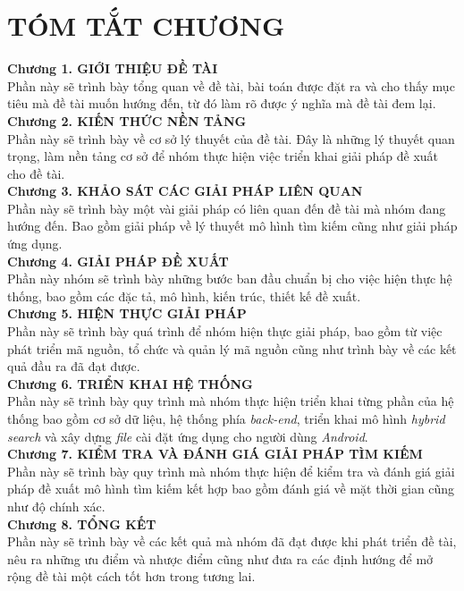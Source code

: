 \chapter*{TÓM TẮT CHƯƠNG}
\textbf{\color{myblue}Chương 1. GIỚI THIỆU ĐỀ TÀI}\\
Phần này sẽ trình bày tổng quan về đề tài, bài toán được đặt ra và cho thấy mục tiêu mà đề tài muốn hướng đến, từ đó làm rõ được ý nghĩa mà đề tài đem lại.
\\\textbf{\color{myblue}Chương 2. KIẾN THỨC NỀN TẢNG}\\
Phần này sẽ trình bày về cơ sở lý thuyết của đề tài. Đây là những lý thuyết quan trọng, làm nền tảng cơ sở để nhóm thực hiện việc triển khai giải pháp đề xuất cho đề tài.
\\\textbf{\color{myblue}Chương 3. KHẢO SÁT CÁC GIẢI PHÁP LIÊN QUAN}\\
Phần này sẽ trình bày một vài giải pháp có liên quan đến đề tài mà nhóm đang hướng đến. Bao gồm giải pháp về lý thuyết mô hình tìm kiếm cũng như giải pháp ứng dụng.
\\\textbf{\color{myblue}Chương 4. GIẢI PHÁP ĐỀ XUẤT}\\
Phần này nhóm sẽ trình bày những bước ban đầu chuẩn bị cho việc hiện thực hệ thống, bao gồm các đặc tả, mô hình, kiến trúc, thiết kế đề xuất.
\\\textbf{\color{myblue}Chương 5. HIỆN THỰC GIẢI PHÁP}\\
Phần này sẽ trình bày quá trình để nhóm hiện thực giải pháp, bao gồm từ việc phát triển mã nguồn, tổ chức và quản lý mã nguồn cũng như trình bày về các kết quả đầu ra đã đạt được.
\\\textbf{\color{myblue}Chương 6. TRIỂN KHAI HỆ THỐNG}\\
Phần này sẽ trình bày quy trình mà nhóm thực hiện triển khai từng phần của hệ thống bao gồm cơ sở dữ liệu, hệ thống phía \textit{back-end}, triển khai mô hình \textit{hybrid search} và xây dựng \textit{file} cài đặt ứng dụng cho người dùng \textit{Android}.
\\\textbf{\color{myblue}Chương 7. KIỂM TRA VÀ ĐÁNH GIÁ GIẢI PHÁP TÌM KIẾM}\\
Phần này sẽ trình bày quy trình mà nhóm thực hiện để kiểm tra và đánh giá giải pháp đề xuất mô hình tìm kiếm kết hợp bao gồm đánh giá về mặt thời gian cũng như độ chính xác.
\\\textbf{\color{myblue}Chương 8. TỔNG KẾT}\\
Phần này sẽ trình bày về các kết quả mà nhóm đã đạt được khi phát triển đề tài, nêu ra những ưu điểm và nhược điểm cũng như đưa ra các định hướng để mở rộng đề tài một cách tốt hơn trong tương lai.